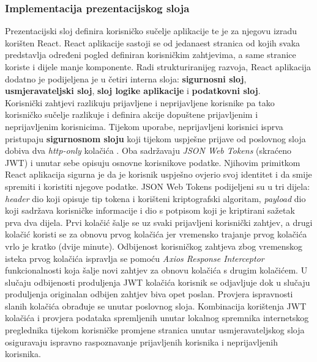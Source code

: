 \documentclass[times, utf8, zavrsni]{fer}
\begin{document}
			\subsubsection{Implementacija prezentacijskog sloja}
			Prezentacijski sloj definira korisničko sučelje aplikacije te je za njegovu izradu korišten React. React aplikacije sastoji se od jedanaest stranica od kojih svaka predstavlja određeni pogled definiran korisničkim zahtjevima, a same stranice koriste i dijele manje komponente. Radi strukturiranijeg razvoja, React aplikacija dodatno je podijeljena je u četiri interna sloja: \textbf{sigurnosni sloj}, \textbf{usmjeravateljski sloj}, \textbf{sloj logike aplikacije} i \textbf{podatkovni sloj}.\\
			Korisnički zahtjevi razlikuju prijavljene i neprijavljene korisnike pa tako korisničko sučelje razlikuje i definira akcije dopuštene prijavljenim i neprijavljenim korisnicima. Tijekom uporabe, neprijavljeni korisnici isprva pristupaju \textbf{sigurnosnom sloju} koji tijekom uspješne prijave od poslovnog sloja dobiva dva \textit{http-only} kolačića . Oba sadržavaju \textit{JSON Web Tokens} (skraćeno JWT) i unutar sebe opisuju osnovne korisnikove podatke. Njihovim primitkom React aplikacija sigurna je da je korisnik uspješno ovjerio svoj identitet i da smije spremiti i koristiti njegove podatke.
		 	JSON Web Tokens podijeljeni su u tri dijela: \textit{header} dio koji opisuje tip tokena i korišteni kriptografski algoritam, \textit{payload} dio koji sadržava korisničke informacije 
			i dio s potpisom koji je kriptirani sažetak prva dva dijela. Prvi kolačić šalje se uz svaki prijavljeni korisnički zahtjev, a drugi kolačić koristi se za obnovu prvog kolačića jer vremensko trajanje prvog kolačića vrlo je kratko (dvije minute). Odbijenost korisničkog zahtjeva zbog vremenskog isteka prvog kolačića ispravlja se pomoću \textit{Axios Response Interceptor} funkcionalnosti koja šalje novi zahtjev za obnovu kolačića s drugim kolačićem. U slučaju odbijenosti produljenja JWT kolačića korisnik se odjavljuje dok u slučaju produljenja originalan odbijen zahtjev biva opet poslan. Provjera ispravnosti slanih kolačića obrađuje se unutar poslovnog sloja. Kombinacija korištenja JWT kolačića i provjera podataka spremljenih unutar lokalnog spremnika internetskog preglednika tijekom korisničke promjene stranica unutar usmjeravateljskog sloja osiguravaju ispravno raspoznavanje prijavljenih korisnika i neprijavljenih korisnika.
\end{document}
